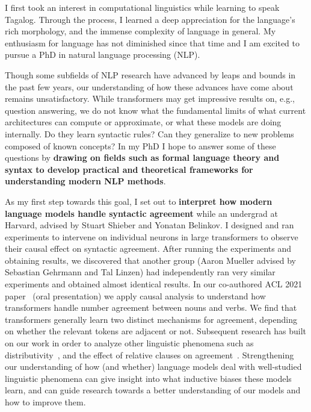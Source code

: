 \documentclass[12pt]{article}
\begin{document}
I first took an interest in computational linguistics 
while learning to speak Tagalog. 
Through the process, I learned a deep appreciation for the language's rich morphology,
and the immense complexity of language in general.
My enthusiasm for language has not diminished since that time
and I am excited to pursue a PhD in natural language processing (NLP).

Though some subfields of NLP research 
have advanced by leaps and bounds in the past few years,
our understanding of how these advances 
have come about remains unsatisfactory.
While transformers may get impressive results on, e.g., question answering,
we do not know what the fundamental limits 
of what current architectures can compute or approximate,
or what these models are doing internally.
Do they learn syntactic rules? 
Can they generalize to new problems composed of known concepts?
In my PhD I hope to answer some of these questions
by \textbf{drawing on fields such as formal language theory and syntax
to develop practical and theoretical frameworks 
for understanding modern NLP methods}.

As my first step towards this goal, 
I set out to \textbf{interpret how modern language models handle syntactic agreement}
while an undergrad at Harvard, advised by Stuart Shieber and Yonatan Belinkov.
I designed and ran experiments
to intervene on individual neurons in large transformers 
to observe their causal effect on syntactic agreement.
After running the experiments and obtaining results,
we discovered that another group 
(Aaron Mueller advised by Sebastian Gehrmann and Tal Linzen)
had independently ran very similar experiments and obtained almost identical results.
In our co-authored ACL 2021 paper~\cite{Finlayson2021CausalAO}
(oral presentation)
we apply causal analysis to understand 
how transformers handle number agreement between nouns and verbs. 
We find that transformers generally learn two distinct mechanisms
for agreement, depending on whether the relevant tokens are adjacent or not.
Subsequent research has built on our work 
in order to analyze other linguistic phenomena 
such as distributivity~\cite{Ban2022TestingPL},
and the effect of relative clauses on agreement~\cite{Ravfogel2021CounterfactualIR}.
Strengthening our understanding of how 
(and whether) 
language models deal with well-studied linguistic phenomena
can give insight into what inductive biases these models learn, 
and can guide research towards a better understanding of our models 
and how to improve them.
\end{document}
